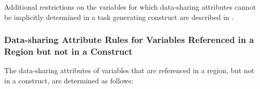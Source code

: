 Additional restrictions on the variables for which data-sharing attributes cannot be
implicitly determined in a task generating construct are described in
.









\subsubsection{Data-sharing Attribute Rules for Variables Referenced in a Region but not in a Construct}
\label{subsubsec:Data-sharing Attribute Rules for Variables Referenced in a Region but not in a Construct}
The data-sharing attributes of variables that are referenced in a region, but not in a
construct, are determined as follows:

